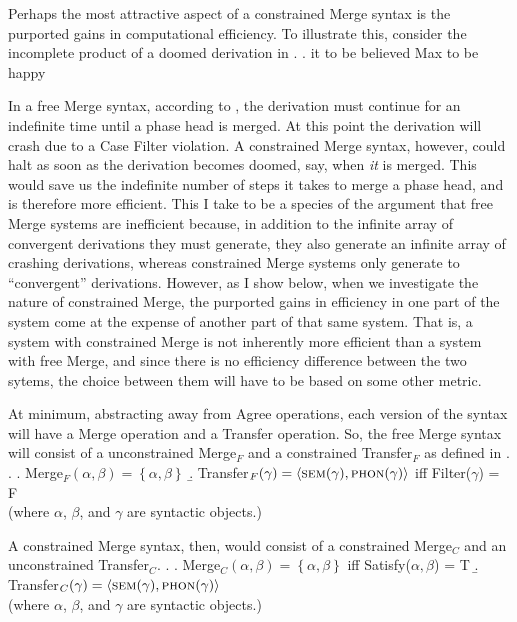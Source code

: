 \documentclass[MilwayThesis]{subfiles}
\begin{document}
Perhaps the most attractive aspect of a constrained Merge syntax is the purported gains in computational efficiency.
To illustrate this, \textcite{frampton2008crash} consider the incomplete product of a doomed derivation in \Next.
\ex. it to be believed Max to be happy

In a free Merge syntax, according to \textcite{frampton2008crash}, the derivation must continue for an indefinite time until a phase head is merged.
At this point the derivation will crash due to a Case Filter violation.
A constrained Merge syntax, however, could halt as soon as the derivation becomes doomed, say, when \textit{it} is merged.
This would save us the indefinite number of steps it takes to merge a phase head, and is therefore more efficient.
This I take to be a species of the argument that free Merge systems are inefficient because, in addition to the infinite array of convergent derivations they must generate, they also generate an infinite array of crashing derivations, whereas constrained Merge systems only generate to ``convergent'' derivations.
However, as I show below, when we investigate the nature of constrained Merge, the purported gains in efficiency in one part of the system come at the expense of another part of that same system.
That is, a system with constrained Merge is not inherently more efficient than a system with free Merge, and since there is no efficiency difference between the two sytems, the choice between them will have to be based on some other metric.

At minimum, abstracting away from Agree operations, each version of the syntax will have a Merge operation and a Transfer operation.
So, the free Merge syntax will consist of a unconstrained Merge$_F$ and a constrained Transfer$_F$ as defined in \Next.
\ex.
\a. Merge$_F(\alpha,\beta) = \left\{ \alpha, \beta \right\}$ 
\b. Transfer$_F(\gamma) = \langle\textsc{sem}(\gamma), \textsc{phon}(\gamma)\rangle$ iff Filter($\gamma$) = F\\
(where $\alpha$, $\beta$, and $\gamma$ are syntactic objects.)

A constrained Merge syntax, then, would consist of a constrained Merge$_C$ and an unconstrained Transfer$_C$.
\ex.
\a. Merge$_C(\alpha,\beta) =\left\{\alpha,\beta\right\}$ iff Satisfy($\alpha,\beta$) = T
\b. Transfer$_C(\gamma) = \langle\textsc{sem}(\gamma), \textsc{phon}(\gamma)\rangle$\\
(where $\alpha$, $\beta$, and $\gamma$ are syntactic objects.)
\end{document}
